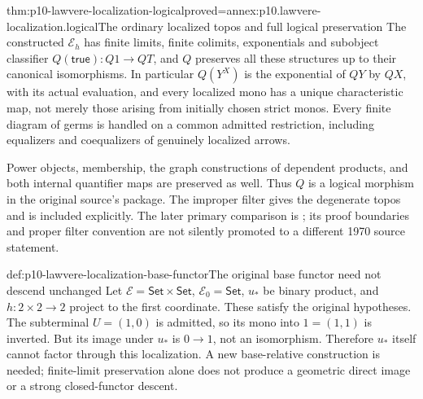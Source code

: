 \begin{hbtheorem}{thm:p10-lawvere-localization-logical}{proved=annex:p10.lawvere-localization.logical}{The ordinary localized topos and full logical preservation}
The constructed \(\mathcal E_h\) has finite limits,
finite colimits, exponentials and subobject classifier
\(Q(\mathsf{true}):Q1\to QT\), and \(Q\) preserves
all these structures up to their canonical isomorphisms.
In particular \(Q(Y^X)\) is the exponential of
\(QY\) by \(QX\), with its actual evaluation, and
every localized mono has a unique characteristic map,
not merely those arising from initially chosen strict
monos.  Every finite diagram of germs is handled on
a common admitted restriction, including equalizers
and coequalizers of genuinely localized arrows.

Power objects, membership, the graph constructions of
dependent products, and both internal quantifier maps
are preserved as well.  Thus \(Q\) is a logical
morphism in the original source's package.  The
improper filter gives the degenerate topos and is
included explicitly.  The later primary comparison is
\cite[V\S9, Theorem~2 and Lemma~3, pp.~261--263]
{MacLaneMoerdijk1992}; its proof boundaries and proper
filter convention are not silently promoted to a
different 1970 source statement.
\end{hbtheorem}

\begin{hbexample}{def:p10-lawvere-localization-base-functor}{The original base functor need not descend unchanged}
Let \(\mathcal E=\mathsf{Set}\times\mathsf{Set}\),
\(\mathcal E_0=\mathsf{Set}\), \(u_*\) be binary
product, and \(h:2\times2\to2\) project to the first
coordinate.  These satisfy the original hypotheses.
The subterminal \(U=(1,0)\) is admitted, so its mono
into \(1=(1,1)\) is inverted.  But its image under
\(u_*\) is \(0\to1\), not an isomorphism.
Therefore \(u_*\) itself cannot factor through this
localization.  A new base-relative construction is
needed; finite-limit preservation alone does not
produce a geometric direct image or a strong
closed-functor descent.
\end{hbexample}

